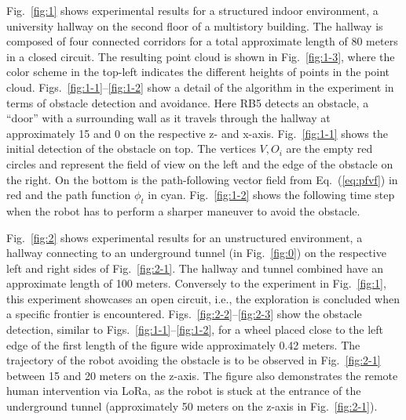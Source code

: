 \documentclass[letterpaper,10pt,conference,twoside]{IEEEtran}
\theoremstyle{definition}
\begin{document}

Fig.~\ref{fig:1} shows experimental results for a structured indoor environment, a university hallway on the second floor of a multistory building. The hallway is composed of four connected corridors for a total approximate length of 80 meters in a closed circuit. %
The resulting point cloud is shown in Fig.~\ref{fig:1-3}, where the color scheme in the top-left indicates the different heights of points in the point cloud. 
%
%
Figs.~\ref{fig:1-1}--\ref{fig:1-2} show a detail of the algorithm in the experiment in terms of obstacle detection and avoidance. Here RB5 detects an obstacle, a ``door'' with a surrounding wall as it travels through the hallway at approximately 15 and 0 on the respective z- and x-axis. Fig.~\ref{fig:1-1} shows the initial detection of the obstacle on top. The vertices $V, O_i$ are the empty red circles and represent the field of view on the left and the edge of the obstacle on the right. On the bottom is the path-following vector field from Eq.~(\ref{eq:pfvf}) in red and the path function $\phi_t$ in cyan. Fig.~\ref{fig:1-2} shows the following time step when the robot has to perform a sharper maneuver to avoid the obstacle.

Fig.~\ref{fig:2} shows experimental results for an unstructured environment, a hallway connecting to an underground tunnel (in Fig.~\ref{fig:0}) on the respective left and right sides of Fig.~\ref{fig:2-1}. The hallway and tunnel combined have an approximate length of 100 meters. Conversely to the experiment in Fig.~\ref{fig:1}, this experiment showcases an open circuit, i.e., the exploration is concluded when a specific frontier is encountered. Figs.~\ref{fig:2-2}--\ref{fig:2-3} show the obstacle detection, similar to Figs.~\ref{fig:1-1}--\ref{fig:1-2}, for a wheel placed close to the left edge of the first length of the figure wide approximately 0.42 meters. The trajectory of the robot avoiding the obstacle is to be observed in Fig.~\ref{fig:2-1} between 15 and 20 meters on the z-axis. The figure also demonstrates the remote human intervention via LoRa, as the robot is stuck at the entrance of the underground tunnel (approximately 50 meters on the z-axis in Fig.~\ref{fig:2-1}).
\end{document}
